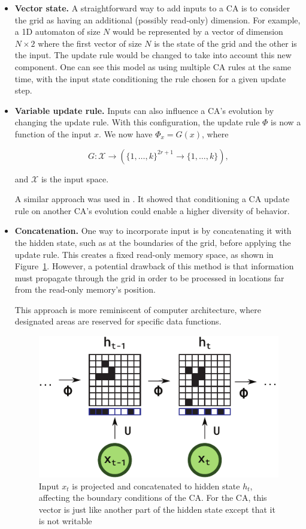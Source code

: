 \begin{itemize}
  \item \textbf{Vector state.} A straightforward way to add inputs to a \ac{CA} is to
        consider the grid as having an additional (possibly read-only)
        dimension. For example, a 1D automaton of size $N$ would be represented by
        a vector of dimension $N\times 2$ where the first vector of size $N$ is the
        state of the grid and the other is the input. The update rule would be
        changed to take into account this new component. One can see this model
        as using multiple \ac{CA} rules at the same time, with the input state
        conditioning the rule chosen for a given update step.

  \item \textbf{Variable update rule.} Inputs can also influence a CA's evolution by
        changing the update rule. With this configuration, the update rule $\Phi$
        is now a function of the input $x$. We now have $\Phi_x = G(x)$, where

            \[G: \mathcal{X} \rightarrow \left({\{ 1, \ldots, k \}}^{2r+1} \to \{1, \ldots, k\}\right),\]

        and $\mathcal{X}$ is the input space.
        
        A similar approach was used in
        \parencite{adamsFormalDefinitionsUnbounded2017}. It showed that
        conditioning a CA update rule on another CA's evolution could enable a
        higher diversity of behavior.

  \item \textbf{Concatenation.} One way to incorporate input is by concatenating 
  it with the hidden state, such as at the boundaries of the grid, before applying the
  update rule. This creates a fixed read-only memory space, as shown in 
  Figure~\ref{fig:concat}. However, a potential drawback of this method is that 
  information must propagate through the grid in order to be processed in locations 
  far from the read-only memory's position. 
        
        This approach is more reminiscent of computer architecture, where designated 
        areas are reserved for specific data functions.

\begin{figure}[ht]
  \centering \includegraphics[width=.5\linewidth]{figures/concat.pdf}
  \caption{\label{fig:concat} Input $x_t$ is projected and concatenated to
    hidden state $h_t$, affecting the boundary conditions of the 
    \ac{CA}. For the \ac{CA}, this vector is just like another part of the
    hidden state except that it is not writable}
\end{figure}
\end{itemize}


